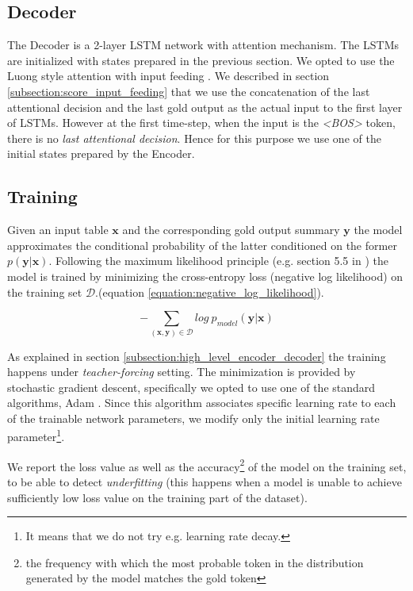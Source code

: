\subsection{Decoder}

The Decoder is a 2-layer LSTM network with attention mechanism. The LSTMs are initialized with states prepared in the previous section. We opted to use the Luong style attention with input feeding \citep{luong2015effective}. We described in section \ref{subsection:score_input_feeding} that we use the concatenation of the last attentional decision and the last gold output as the actual input to the first layer of LSTMs. However at the first time-step, when the input is the \emph{\textless BOS\textgreater} token, there is no \emph{last attentional decision}. Hence for this purpose we use one of the initial states prepared by the Encoder.

\subsection{Training}

Given an input table $\boldsymbol{x}$ and the corresponding gold output summary $\boldsymbol{y}$ the model approximates the conditional probability of the latter conditioned on the former $p(\boldsymbol{y} | \boldsymbol{x})$. Following the maximum likelihood principle (e.g. section 5.5 in \citep{Goodfellow-et-al-2016}) the model is trained by minimizing the cross-entropy loss (negative log likelihood) on the training set $\mathcal{D}$.(equation \ref{equation:negative_log_likelihood}).

\begin{equation} \label{equation:negative_log_likelihood}
    - \sum_{(\boldsymbol{x}, \boldsymbol{y}) \in \mathcal{D}}{log\ p_{model}(\boldsymbol{y} | \boldsymbol{x})}
\end{equation}

As explained in section \ref{subsection:high_level_encoder_decoder} the training happens under \emph{teacher-forcing} setting. The minimization is provided by stochastic gradient descent, specifically we opted to use one of the standard algorithms, Adam \citep{kingma2014adam}. Since this algorithm associates specific learning rate to each of the trainable network parameters, we modify only the initial learning rate parameter\footnote{It means that we do not try e.g. learning rate decay.}.

We report the loss value as well as the accuracy\footnote{the frequency with which the most probable token in the distribution generated by the model matches the gold token} of the model on the training set, to be able to detect \emph{underfitting} (this happens when a model is unable to achieve sufficiently low loss value on the training part of the dataset).


